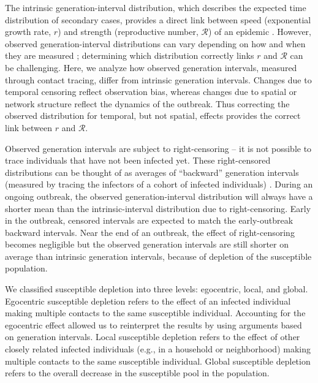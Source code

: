 \documentclass[12pt]{article}
\newcommand{\RR}{\ensuremath{{\mathcal R}}}
\begin{document}
The intrinsic generation-interval distribution, which describes the expected time distribution of secondary cases, provides a direct link between speed (exponential growth rate, $r$) and strength (reproductive number, $\RR$) of an epidemic \citep{wallinga2007generation, svensson2007note, svensson2015influence, park2019practical}.
However, observed generation-interval distributions can vary depending on how and when they are measured \citep{nishiura2010time, tomba2010some, champredon2015intrinsic, britton2019estimation};
determining which distribution correctly links $r$ and $\RR$ can be challenging.
Here, we analyze how observed generation intervals, measured through contact tracing, differ from intrinsic generation intervals.
Changes due to temporal censoring reflect observation bias, whereas changes due to spatial or network structure reflect the dynamics of the outbreak.
Thus correcting the observed distribution for temporal, but not spatial, effects provides the correct link between $r$ and $\RR$.

Observed generation intervals are subject to right-censoring -- it is not possible to trace individuals that have not been infected yet.
These right-censored distributions can be thought of as averages of ``backward'' generation intervals (measured by tracing the infectors of a cohort of infected individuals) \citep{kenah2008generation, nishiura2010time, tomba2010some, champredon2015intrinsic, britton2019estimation}.
During an ongoing outbreak, the observed generation-interval distribution will always have a shorter mean than the intrinsic-interval distribution due to right-censoring.
Early in the outbreak, censored intervals are expected to match the early-outbreak backward intervals.
Near the end of an outbreak, the effect of right-censoring becomes negligible but the observed generation intervals are still shorter on average than intrinsic generation intervals, because of depletion of the susceptible population.

We classified susceptible depletion into three levels: egocentric, local, and global.
Egocentric susceptible depletion refers to the effect of an infected individual making multiple contacts to the same susceptible individual.
Accounting for the egocentric effect allowed us to reinterpret the results by \cite{trapman2016inferring} using arguments based on generation intervals.
Local susceptible depletion refers to the effect of other closely related infected individuals (e.g., in a household or neighborhood) making multiple contacts to the same susceptible individual.
Global susceptible depletion refers to the overall decrease in the susceptible pool in the population.
\end{document}
